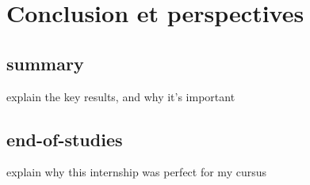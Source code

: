 \chapter*{Conclusion et perspectives}

\section*{summary}
explain the key results, and why it's important

\section*{end-of-studies}

explain why this internship was perfect for my cursus


